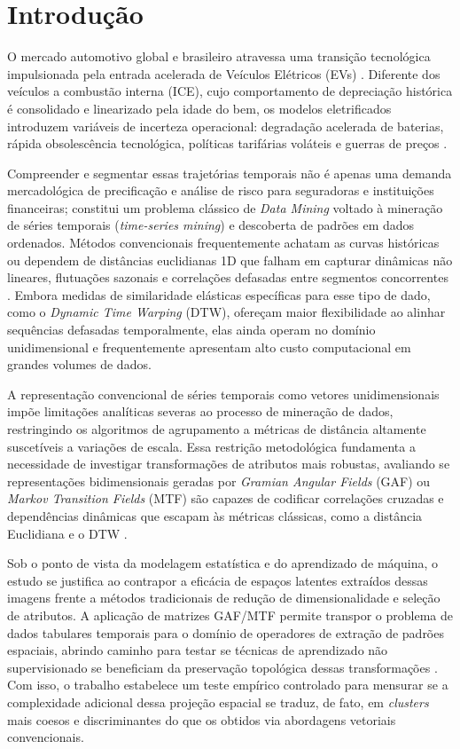 \section{Introdução}

O mercado automotivo global e brasileiro atravessa uma transição tecnológica impulsionada pela entrada acelerada de Veículos Elétricos (EVs) \cite{alvarez2024modelagem}. Diferente dos veículos a combustão interna (ICE), cujo comportamento de depreciação histórica é consolidado e linearizado pela idade do bem, os modelos eletrificados introduzem variáveis de incerteza operacional: degradação acelerada de baterias, rápida obsolescência tecnológica, políticas tarifárias voláteis e guerras de preços \cite{gautam2024depreciation, li2026global}.

Compreender e segmentar essas trajetórias temporais não é apenas uma demanda mercadológica de precificação e análise de risco para seguradoras e instituições financeiras; constitui um problema clássico de \textit{Data Mining} voltado à mineração de séries temporais (\textit{time-series mining}) e descoberta de padrões em dados ordenados. Métodos convencionais frequentemente achatam as curvas históricas ou dependem de distâncias euclidianas 1D que falham em capturar dinâmicas não lineares, flutuações sazonais e correlações defasadas entre segmentos concorrentes \cite{schloter2022empirical}. Embora medidas de similaridade elásticas específicas para esse tipo de dado, como o \textit{Dynamic Time Warping} (DTW), ofereçam maior flexibilidade ao alinhar sequências defasadas temporalmente, elas ainda operam no domínio unidimensional e frequentemente apresentam alto custo computacional em grandes volumes de dados.

A representação convencional de séries temporais como vetores unidimensionais impõe limitações analíticas severas ao processo de mineração de dados, restringindo os algoritmos de agrupamento a métricas de distância altamente suscetíveis a variações de escala. Essa restrição metodológica fundamenta a necessidade de investigar transformações de atributos mais robustas, avaliando se representações bidimensionais geradas por \textit{Gramian Angular Fields} (GAF) ou \textit{Markov Transition Fields} (MTF) são capazes de codificar correlações cruzadas e dependências dinâmicas que escapam às métricas clássicas, como a distância Euclidiana e o DTW \cite{wu2023imaging, ulyanin2019feature}.

Sob o ponto de vista da modelagem estatística e do aprendizado de máquina, o estudo se justifica ao contrapor a eficácia de espaços latentes extraídos dessas imagens frente a métodos tradicionais de redução de dimensionalidade e seleção de atributos. A aplicação de matrizes GAF/MTF permite transpor o problema de dados tabulares temporais para o domínio de operadores de extração de padrões espaciais, abrindo caminho para testar se técnicas de aprendizado não supervisionado se beneficiam da preservação topológica dessas transformações \cite{jueco2024performance}. Com isso, o trabalho estabelece um teste empírico controlado para mensurar se a complexidade adicional dessa projeção espacial se traduz, de fato, em \textit{clusters} mais coesos e discriminantes do que os obtidos via abordagens vetoriais convencionais.

